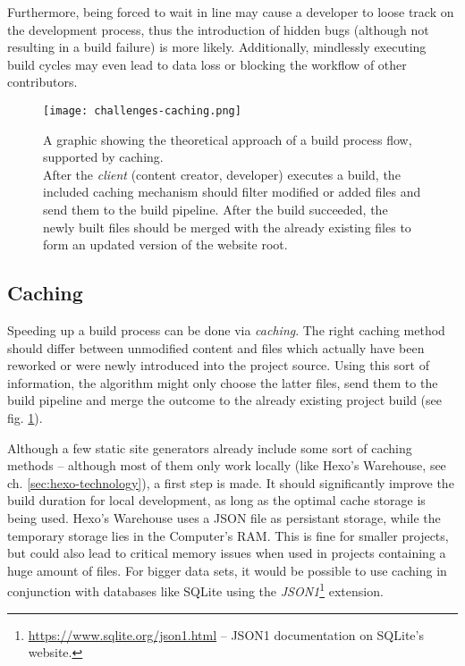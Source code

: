 Furthermore, being forced to wait in line may cause a developer to loose track on the development process, thus the introduction of hidden bugs (although not resulting in a build failure) is more likely. Additionally, mindlessly executing build cycles may even lead to data loss or blocking the workflow of other contributors.

\begin{figure} %
    \centering
    \texttt{[image: challenges-caching.png]}
    \caption{A graphic showing the theoretical approach of a build process flow, supported by caching.\\
    After the \emph{client} (content creator, developer) executes a build, the included caching mechanism should filter modified or added files and send them to the build pipeline. After the build succeeded, the newly built files should be merged with the already existing files to form an updated version of the website root.}
    \label{fig:caching}
\end{figure}
%

\subsection{Caching}
\label{sec:challenges-caching}
Speeding up a build process can be done via \emph{caching}. The right caching method should differ between unmodified content and files which actually have been reworked or were newly introduced into the project source. Using this sort of information, the algorithm might only choose the latter files, send them to the build pipeline and merge the outcome to the already existing project build (see fig. \ref{fig:caching}).

Although a few static site generators already include some sort of caching methods -- although most of them only work locally (like Hexo's Warehouse, see ch. \ref{sec:hexo-technology}), a first step is made. It should significantly improve the build duration for local development, as long as the optimal cache storage is being used. Hexo's Warehouse uses a JSON file as persistant storage, while the temporary storage lies in the Computer's RAM. This is fine for smaller projects, but could also lead to critical memory issues when used in projects containing a huge amount of files. For bigger data sets, it would be possible to use caching in conjunction with databases like SQLite using the \emph{JSON1}\footnote{\url{https://www.sqlite.org/json1.html} -- JSON1 documentation on SQLite's website.} extension.

